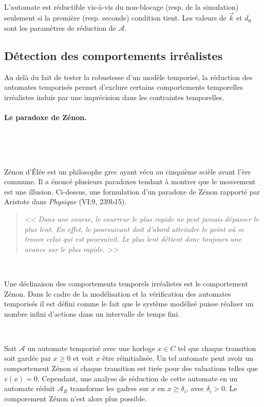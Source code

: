       ~
      
      L'automate est réductible vis-à-vis du non-blocage (resp. de la
      simulation) seulement si la première (resp. seconde) condition tient. Les
      valeurs de $\vec{k}$ et $d_0$ sont les paramètres de réduction de
      $\mathcal{A}$.

    \subsection{Détection des comportements irréalistes}

      Au delà du fait de tester la robustesse d'un modèle temporisé, la
      réduction des automates temporisés permet d'exclure certains comportements
      temporelles irréalistes induis par une imprécision dans les contraintes
      temporelles.
    
      \paragraph{Le paradoxe de Zénon.} ~

        ~

        Zénon d'Élée est un philosophe grec ayant vécu au cinquième scièle avant
        l'ère commune. Il a énoncé plusieurs paradoxes tendant à montrer que le
        mouvement est une illusion. Ci-dessus, une formulation d'un paradoxe de
        Zénon rapporté par Aristote dans {\it Physique} (VI:9, 239b15).
      
        \begin{quote} \em
          << Dans une course, le courreur le plus rapide ne peut jamais dépasser
          le plus lent. En effet, le poursuivant doit d'abord atteindre le point
          où se trouve celui qui est poursuivit. Le plus lent détient donc
          toujours une avance sur le plus rapide. >>
        \end{quote}

        ~

        Une déclinaison des comportements temporels irréalistes est le
        comportement Zénon. Dans le cadre de la modélisation et la vérification
        des automates temporisés il est défini comme le fait que le système
        modélisé puisse réaliser un nombre infini d'actions dans un intervalle
        de temps fini.
    
        ~

        Soit $\mathcal{A}$ un automate temporisé avec une horloge $x \in C$ tel
        que chaque transition soit gardée par $x \ge 0$ et voit $x$ être
        réinitialisée. Un tel automate peut avoir un comportement Zénon si
        chaque transition est tirée pour des valuations telles que $v(x) =
        0$. Cependant, une analyse de réduction de cette automate en un automate
        réduit $\mathcal{A}_R$ transforme les gadres sur $x$ en $x \ge
        \delta_i$, avec $\delta_i > 0$. Le comporement Zénon n'est alors plus
        possible.
        
